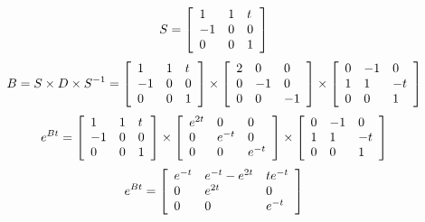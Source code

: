\documentclass[12pt,letterpaper,reqno]{amsart}
\begin{document}
\begin{enumerate}
\begin{enumerate}
    $$S = \left[ \begin{array} { l l l } { 1 } & { 1 } & { t } \\ { -1 } & { 0 } & { 0 } \\ { 0 } & { 0 } & { 1 } \end{array} \right]$$
    $$B = S\times D\times S^{-1} = \left[ \begin{array} { l l l } { 1 } & { 1 } & { t } \\ { -1 } & { 0 } & { 0 } \\ { 0 } & { 0 } & { 1 } \end{array} \right] \times \left[ \begin{array} { l l l } { 2 } & { 0 } & { 0 } \\ { 0 } & { -1 } & { 0 } \\ { 0 } & { 0 } & { -1 } \end{array} \right] \times \left[ \begin{array} { l l l } { 0 } & { -1 } & { 0 } \\ { 1 } & { 1 } & { -t } \\ { 0 } & { 0 } & { 1 } \end{array} \right]$$
    $$e^{B t} = \left[ \begin{array} { l l l } { 1 } & { 1 } & { t } \\ { -1 } & { 0 } & { 0 } \\ { 0 } & { 0 } & { 1 } \end{array} \right] \times \left[ \begin{array} { l l l } { e^{2t} } & { 0 } & { 0 } \\ { 0 } & { e^{-t}} & { 0 } \\ { 0 } & { 0 } & { e^{-t}} \end{array} \right] \times \left[ \begin{array} { l l l } { 0 } & { -1 } & { 0 } \\ { 1 } & { 1 } & { -t } \\ { 0 } & { 0 } & { 1 } \end{array} \right]$$
    $$e^{B t} = \left[ \begin{array} { l l l } { e^{-t} } & { e^{-t}-e^{2t} } & { te^{-t} } \\ { 0 } & { e^{2t} } & { 0 } \\ { 0 } & { 0 } & { e^{-t} } \end{array} \right]$$
\end{enumerate}
\end{enumerate}
\end{document}
